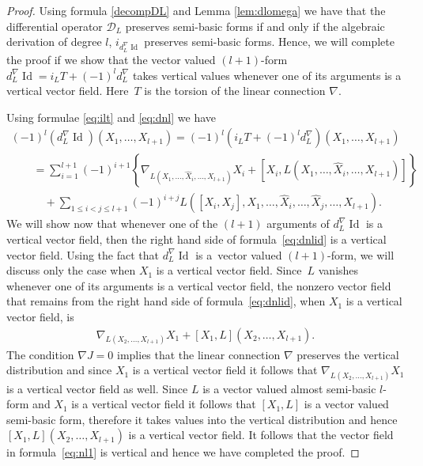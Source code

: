 \documentclass[11pt]{article}
\numberwithin{equation}{section}
\begin{document}
\begin{proof}
Using formula \eqref{decompDL} and Lemma \ref{lem:dlomega} we have
that the dif\/ferential operator ${\mathcal D}_L$ preserves semi-basic forms
if and only if the algebraic derivation of degree $l$,
$i_{d^{\nabla}_L\operatorname{Id}}$ preserves semi-basic forms. Hence,
we will complete the proof if we show that the vector valued
$(l+1)$-form $d^{\nabla}_L\operatorname{Id}=i_LT+(-1)^ld^{\nabla}_L$
takes vertical values whenever one of its arguments is a vertical
vector f\/ield. Here~$T$ is the torsion of the linear connection $\nabla$.

Using formulae \eqref{eq:ilt} and \eqref{eq:dnl} we have
\begin{gather}
\nonumber   (-1)^l(d^{\nabla}_L\operatorname{Id})(X_1,\dots ,X_{l+1}) =(-1)^l(i_LT+(-1)^ld^{\nabla}_L)(X_1,\dots ,X_{l+1})
\\[-0.5ex] \nonumber
\qquad{}  =  \sum_{i=1}^{l+1}(-1)^{i+1}
\left\{\nabla_{L(X_1,\dots ,\hat{X}_i,\dots ,X_{l+1})}X_i + [X_i,
  L(X_1,\dots ,\hat{X}_i,\dots ,X_{l+1})]\right\} \\[-0.5ex]
 \qquad\quad{}  +  \sum_{1\leq i<j\leq
  l+1} (-1)^{i+j}L([X_i,X_j], X_1,\dots , \hat{X}_i,\dots , \hat{X}_j,\dots ,
X_{l+1}). \label{eq:dnlid}
\end{gather}
We will show now that whenever one of the
$(l+1)$ arguments of $d^{\nabla}_L\operatorname{Id}$ is a vertical
vector f\/ield, then the right hand side of formula~\eqref{eq:dnlid} is
a vertical vector f\/ield. Using the fact that $d^{\nabla}_L\operatorname{Id}$ is a~vector valued $(l+1)$-form, we will discuss only the case when $X_1$ is a vertical
vector f\/ield. Since~$L$ vanishes whenever one of its arguments is a
vertical vector f\/ield, the nonzero vector f\/ield that remains from the
right hand side of formula~\eqref{eq:dnlid}, when $X_1$ is a vertical
vector f\/ield, is
\begin{gather}
\nabla_{L(X_2,\dots ,X_{l+1})}X_1+[X_1,L](X_2,\dots ,X_{l+1}). \label{eq:nl1}
\end{gather} The condition $\nabla J=0$ implies that the linear
connection $\nabla$ preserves the vertical distribution and since $X_1$ is a vertical
vector f\/ield it follows that $\nabla_{L(X_2,\dots,X_{l+1})}X_1 $ is a
vertical vector f\/ield as well. Since $L$ is a vector valued almost
semi-basic $l$-form and $X_1$ is a vertical
vector f\/ield it follows that $[X_1, L]$ is a vector valued semi-basic
form, therefore it takes values into the vertical distribution and
hence  $[X_1,L](X_2,\dots ,X_{l+1})$ is a vertical vector f\/ield. It
follows that the vector f\/ield in formula~\eqref{eq:nl1} is vertical
and hence we have completed the proof.
\end{proof}
\end{document}
